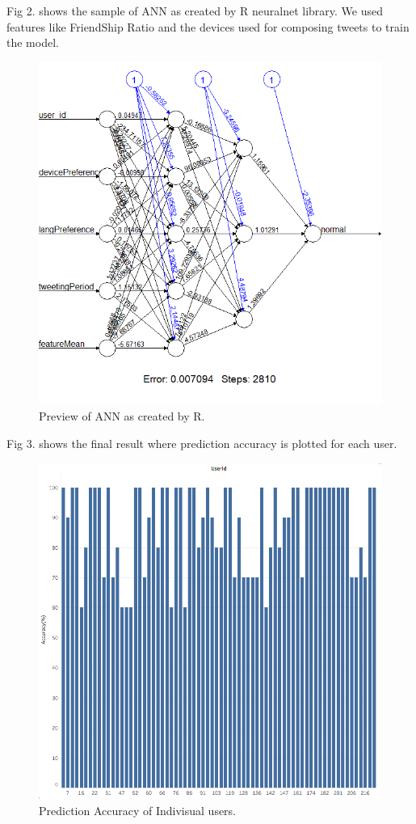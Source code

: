 \documentclass[conference]{IEEEtran}
\begin{document}
 Fig 2. shows the sample of ANN as created by R neuralnet library. We used features like FriendShip Ratio and the devices used for composing tweets 
 to train the model.
 

\begin{figure}[h!]
  \includegraphics[scale=0.4]{sample_ann}
  \caption{Preview of ANN as created by R.}
\end{figure}

Fig 3. shows the final result where prediction accuracy is plotted for each user.

\begin{figure}[h!]
  \includegraphics[scale=0.4]{AccuracyMatrix}
  \caption{ Prediction Accuracy of Indivisual users.}
\end{figure}
\end{document}
